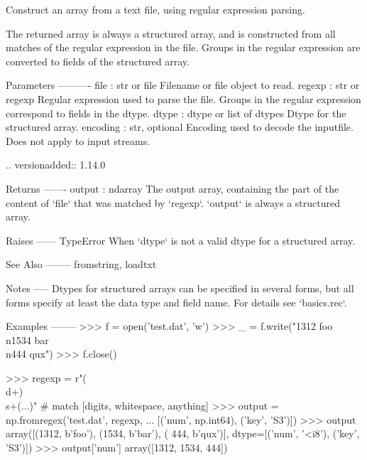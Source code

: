 \begin{DoxyVerb}Construct an array from a text file, using regular expression parsing.

The returned array is always a structured array, and is constructed from
all matches of the regular expression in the file. Groups in the regular
expression are converted to fields of the structured array.

Parameters
----------
file : str or file
    Filename or file object to read.
regexp : str or regexp
    Regular expression used to parse the file.
    Groups in the regular expression correspond to fields in the dtype.
dtype : dtype or list of dtypes
    Dtype for the structured array.
encoding : str, optional
    Encoding used to decode the inputfile. Does not apply to input streams.

    .. versionadded:: 1.14.0

Returns
-------
output : ndarray
    The output array, containing the part of the content of `file` that
    was matched by `regexp`. `output` is always a structured array.

Raises
------
TypeError
    When `dtype` is not a valid dtype for a structured array.

See Also
--------
fromstring, loadtxt

Notes
-----
Dtypes for structured arrays can be specified in several forms, but all
forms specify at least the data type and field name. For details see
`basics.rec`.

Examples
--------
>>> f = open('test.dat', 'w')
>>> _ = f.write("1312 foo\\n1534  bar\\n444   qux")
>>> f.close()

>>> regexp = r"(\\d+)\\s+(...)"  # match [digits, whitespace, anything]
>>> output = np.fromregex('test.dat', regexp,
...                       [('num', np.int64), ('key', 'S3')])
>>> output
array([(1312, b'foo'), (1534, b'bar'), ( 444, b'qux')],
      dtype=[('num', '<i8'), ('key', 'S3')])
>>> output['num']
array([1312, 1534,  444])\end{DoxyVerb}
 \mbox{\label{namespacenumpy_1_1lib_1_1npyio_a02c1f00c4ea3d1d92c6ef862e15e0e38}} 
